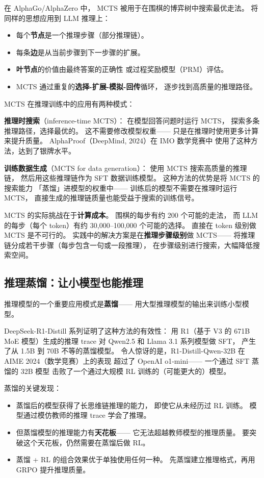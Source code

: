 在 AlphaGo/AlphaZero 中，
MCTS 被用于在围棋的博弈树中搜索最优走法。
将同样的思想应用到 LLM 推理上：
\begin{itemize}[noitemsep]
  \item 每个\textbf{节点}是一个推理步骤（部分推理链）。
  \item 每条\textbf{边}是从当前步骤到下一步骤的扩展。
  \item \textbf{叶节点}的价值由最终答案的正确性
        或过程奖励模型（PRM）评估。
  \item MCTS 通过重复的\textbf{选择-扩展-模拟-回传}循环，
        逐步找到高质量的推理路径。
\end{itemize}

MCTS 在推理训练中的应用有两种模式：

\textbf{推理时搜索}（inference-time MCTS）：
在模型回答问题时运行 MCTS，
探索多条推理路径，选择最优的。
这不需要修改模型权重——
只是在推理时使用更多计算来提升质量。
AlphaProof（DeepMind, 2024）在 IMO 数学竞赛中
使用了这种方法，达到了银牌水平。

\textbf{训练数据生成}（MCTS for data generation）：
使用 MCTS 搜索高质量的推理链，
然后用这些推理链作为 SFT 数据训练模型。
这种方法的优势是将 MCTS 的搜索能力
「蒸馏」进模型的权重中——
训练后的模型不需要在推理时运行 MCTS，
直接生成的推理链质量也能受益于搜索的训练信号。

MCTS 的实际挑战在于\textbf{计算成本}。
围棋的每步有约 200 个可能的走法，
而 LLM 的每步（每个 token）有约 30,000--100,000 个可能的选择。
直接在 token 级别做 MCTS 是不可行的。
实践中的解决方案是在\textbf{推理步骤级别}做 MCTS——
将推理链分成若干步骤（每步包含一句或一段推理），
在步骤级别进行搜索，大幅降低搜索空间。

\subsection{推理蒸馏：让小模型也能推理}

推理模型的一个重要应用模式是\textbf{蒸馏}——
用大型推理模型的输出来训练小型模型。

DeepSeek-R1-Distill 系列证明了这种方法的有效性：
用 R1（基于 V3 的 671B MoE 模型）生成的推理 trace
对 Qwen2.5 和 Llama 3.1 系列模型做 SFT，
产生了从 1.5B 到 70B 不等的蒸馏模型。
令人惊讶的是，R1-Distill-Qwen-32B
在 AIME 2024（数学竞赛）上的表现
超过了 OpenAI o1-mini——
一个通过 SFT 蒸馏的 32B 模型
击败了一个通过大规模 RL 训练的（可能更大的）模型。

蒸馏的关键发现：
\begin{itemize}[noitemsep]
  \item 蒸馏后的模型获得了长思维链推理的能力，
        即使它从未经历过 RL 训练。
        模型通过模仿教师的推理 trace 学会了推理。
  \item 但蒸馏模型的推理能力有\textbf{天花板}——
        它无法超越教师模型的推理质量。
        要突破这个天花板，仍然需要在蒸馏后做 RL。
  \item 蒸馏 + RL 的组合效果优于单独使用任何一种。
        先蒸馏建立推理格式，再用 GRPO 提升推理质量。
\end{itemize}

